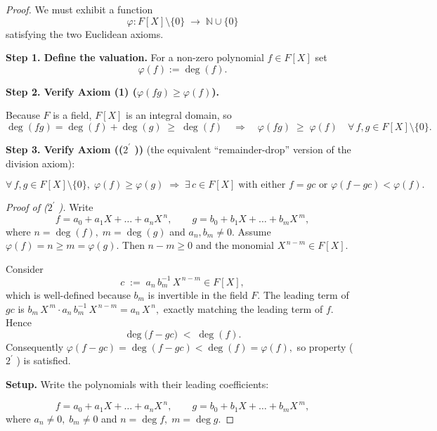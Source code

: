 \documentclass[12pt]{article}
\theoremstyle{definition} %
\theoremstyle{plain} %
\begin{document}
  \begin{proof}
  We must exhibit a function
  \[
    \varphi : F[X]\setminus\{0\}\;\longrightarrow\;\mathbb N\cup\{0\}
  \]
  satisfying the two Euclidean axioms.
  
  \medskip
  \textbf{Step 1.  Define the valuation.}  
  For a non-zero polynomial \(f\in F[X]\) set
  \[
     \boxed{\; \varphi(f) := \deg(f). \;}
  \]
  
  \medskip
  \textbf{Step 2.  Verify Axiom (1)  (\(\varphi(fg) \ge \varphi(f)\)).}
  
  Because \(F\) is a field, \(F[X]\) is an integral domain, so
  \[
     \deg(fg) = \deg(f) + \deg(g) \;\ge\; \deg(f)
     \quad\Longrightarrow\quad
     \varphi(fg)\;\ge\;\varphi(f)
     \quad\forall\,f,g\in F[X]\setminus\{0\}.
  \]
  
  \medskip
  \textbf{Step 3.  Verify Axiom (($2^\prime$  ))}  
  (the equivalent “remainder-drop” version of the division axiom):
  
  \[
     \forall\,f,g\in F[X]\setminus\{0\},\;
     \varphi(f)\ge\varphi(g)
     \;\Longrightarrow\;
     \exists\,c\in F[X]\;
     \text{with either } f = gc \text{ or } \varphi(f-gc)<\varphi(f).
  \]
  
  \emph{Proof of ($2^\prime$  ).}  
  Write
  \[
    f = a_0 + a_1X + \dots + a_nX^{\,n},
    \qquad
    g = b_0 + b_1X + \dots + b_mX^{\,m},
  \]
  where \(n=\deg(f),\;m=\deg(g)\) and \(a_n,b_m\neq0\).
  Assume \(\varphi(f)=n\ge m=\varphi(g)\).
  Then \(n-m\ge 0\) and the monomial \(X^{\,n-m}\in F[X]\).
  
  Consider
  \[
    c \;:=\; a_n\,b_m^{-1}\,X^{\,n-m}\in F[X],
  \]
  which is well-defined because \(b_m\) is invertible in the field \(F\).
  The leading term of \(gc\) is
  \(
      b_m\,X^{\,m}\cdot a_n\,b_m^{-1}\,X^{\,n-m} = a_n\,X^{\,n},
  \)
  exactly matching the leading term of \(f\).
  Hence
  \[
     \deg\!\bigl(f-gc\bigr)\;<\;\deg(f).
  \]
  Consequently
  \(
     \varphi(f-gc) = \deg(f-gc) < \deg(f) = \varphi(f),
  \)
  so property ($2^\prime$  ) is satisfied.

\textbf{Setup.}  
Write the polynomials with their leading coefficients:

\[
   f = a_0 + a_1X + \dots + a_nX^{\,n},
   \qquad
   g = b_0 + b_1X + \dots + b_mX^{\,m},
\]
where \(a_n\neq0,\;b_m\neq0\) and \(n=\deg f,\;m=\deg g\).


\end{proof}
\end{document}
